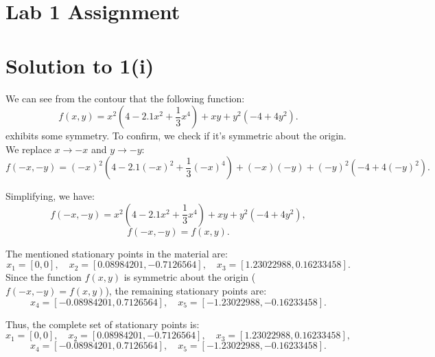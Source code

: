 \documentclass{article}
\begin{document}
\section*{\hspace{4cm}\textbf{Lab 1 Assignment}}

\section{Solution to 1(i)}

We can see from the contour that the following function: 
\[
f(x, y) = x^2\left(4 - 2.1x^2 + \frac{1}{3}x^4\right) + xy + y^2\left(-4 + 4y^2\right).
\] 
exhibits some symmetry. To confirm, we check if it's symmetric about the origin. We replace \(x \to -x\) and \(y \to -y\):
\[
f(-x, -y) = (-x)^2\left(4 - 2.1(-x)^2 + \frac{1}{3}(-x)^4\right) + (-x)(-y) + (-y)^2\left(-4 + 4(-y)^2\right).
\]

Simplifying, we have:
\[
f(-x, -y) = x^2\left(4 - 2.1x^2 + \frac{1}{3}x^4\right) + xy + y^2\left(-4 + 4y^2\right),
\]
\[
f(-x, -y) = f(x, y).
\]

The mentioned stationary points in the material are:
\[
x_1 = [0, 0], \quad x_2 = [0.08984201, -0.7126564], \quad x_3 = [1.23022988, 0.16233458].
\]
Since the function \(f(x, y)\) is symmetric about the origin (\(f(-x, -y) = f(x, y)\)), the remaining stationary points are:
\[
x_4 = [-0.08984201, 0.7126564], \quad x_5 = [-1.23022988, -0.16233458].
\]

Thus, the complete set of stationary points is:
\[
x_1 = [0, 0], \quad x_2 = [0.08984201, -0.7126564], \quad x_3 = [1.23022988, 0.16233458],
\]
\[
x_4 = [-0.08984201, 0.7126564], \quad x_5 = [-1.23022988, -0.16233458].
\]
\end{document}
